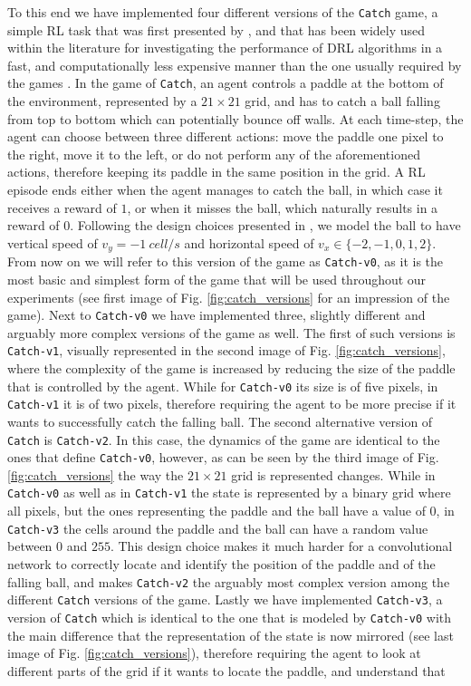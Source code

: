 To this end we have implemented four different versions of the \texttt{Catch} game, a simple RL task that was first presented by \citet{mnih2014recurrent}, and that has been widely used within the literature for investigating the performance of DRL algorithms in a fast, and computationally less expensive manner than the one usually required by the  games \cite{vanjos2018deep, aittahar2020empirical}. In the game of \texttt{Catch}, an agent controls a paddle at the bottom of the environment, represented by a $21 \times 21$ grid, and has to catch a ball falling from top to bottom which can potentially bounce off walls. At each time-step, the agent can choose between three different actions: move the paddle one pixel to the right, move it to the left, or do not perform any of the aforementioned actions, therefore keeping its paddle in the same position in the grid. A RL episode ends either when the agent manages to catch the ball, in which case it receives a reward of $1$, or when it misses the ball, which naturally results in a reward of $0$. Following the design choices presented in \cite{vanjos2017deep}, we model the ball to have vertical speed of $v_y=-1 \: cell/s$ and horizontal speed of $v_x \in \{-2,-1,0,1,2\}$. From now on we will refer to this version of the game as \texttt{Catch-v0}, as it is the most basic and simplest form of the game that will be used throughout our experiments (see first image of Fig. \ref{fig:catch_versions} for an impression of the game). Next to \texttt{Catch-v0} we have implemented three, slightly different and arguably more complex versions of the game as well. The first of such versions is \texttt{Catch-v1}, visually represented in the second image of Fig. \ref{fig:catch_versions}, where the complexity of the game is increased by reducing the size of the paddle that is controlled by the agent. While for \texttt{Catch-v0} its size is of five pixels, in \texttt{Catch-v1} it is of two pixels, therefore requiring the agent to be more precise if it wants to successfully catch the falling ball. The second alternative version of \texttt{Catch} is \texttt{Catch-v2}. In this case, the dynamics of the game are identical to the ones that define \texttt{Catch-v0}, however, as can be seen by the third image of Fig. \ref{fig:catch_versions} the way the $21 \times 21$ grid is represented changes. While in \texttt{Catch-v0} as well as in \texttt{Catch-v1} the state is represented by a binary grid where all pixels, but the ones representing the paddle and the ball have a value of $0$, in \texttt{Catch-v3} the cells around the paddle and the ball can have a random value between $0$ and $255$. This design choice makes it much harder for a convolutional network to correctly locate and identify the position of the paddle and of the falling ball, and makes \texttt{Catch-v2} the arguably most complex version among the different \texttt{Catch} versions of the game. Lastly we have implemented \texttt{Catch-v3}, a version of \texttt{Catch} which is identical to the one that is modeled by \texttt{Catch-v0} with the main difference that the representation of the state is now mirrored (see last image of Fig. \ref{fig:catch_versions}), therefore requiring the agent to look at different parts of the grid if it wants to locate the paddle, and understand that 